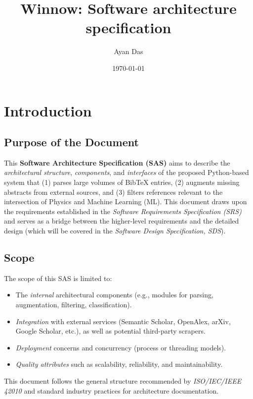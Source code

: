 \documentclass[12pt]{article}
\title{Winnow: Software architecture specification}
\author{Ayan Das}
\date{\today}
\begin{document}
\maketitle
\tableofcontents

\section{Introduction}

\subsection{Purpose of the Document}
This \textbf{Software Architecture Specification (SAS)} aims to describe the \emph{architectural structure}, \emph{components}, and \emph{interfaces} of the proposed Python-based system that (1) parses large volumes of BibTeX entries, (2) augments missing abstracts from external sources, and (3) filters references relevant to the intersection of Physics and Machine Learning (ML). This document draws upon the requirements established in the \emph{Software Requirements Specification (SRS)} and serves as a bridge between the higher-level requirements and the detailed design (which will be covered in the \emph{Software Design Specification, SDS}).

\subsection{Scope}
The scope of this SAS is limited to:
\begin{itemize}
  \item The \emph{internal} architectural components (e.g., modules for parsing, augmentation, filtering, classification).
  \item \emph{Integration} with external services (Semantic Scholar, OpenAlex, arXiv, Google Scholar, etc.), as well as potential third-party scrapers.
  \item \emph{Deployment} concerns and concurrency (process or threading models).
  \item \emph{Quality attributes} such as scalability, reliability, and maintainability.
\end{itemize}
This document follows the general structure recommended by \emph{ISO/IEC/IEEE 42010} and standard industry practices for architecture documentation.
\end{document}

